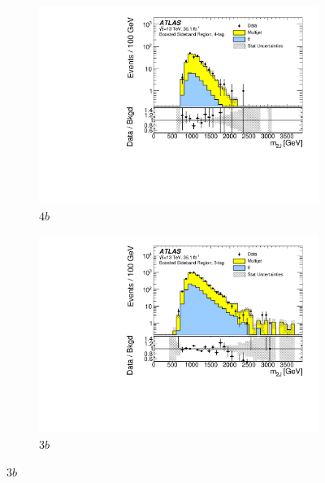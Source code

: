 \begin{figure}[htb!]
  \centering
  \captionsetup{justification=centering}
    \hspace{-2cm}
    \begin{subfigure}[b]{0.35\textwidth}
        \includegraphics[width=\textwidth,angle=-90]{figures/boosted/Paperplot/Moriond_bkg_9_FourTag_Sideband_mHH_l_1.pdf}
        \caption{$4b$}
        \label{fig:boosted-sb-mjj-4b}
    \end{subfigure}
    \quad \quad \quad \quad \quad
    \begin{subfigure}[b]{0.35\textwidth}
        \includegraphics[width=\textwidth,angle=-90]{figures/boosted/Paperplot/Moriond_bkg_9_ThreeTag_Sideband_mHH_l_1.pdf}
        \caption{$3b$}
        \label{fig:boosted-sb-mjj-3b}
    \end{subfigure}

\end{figure}
